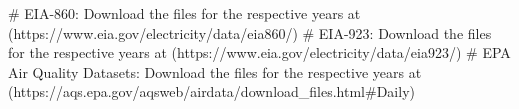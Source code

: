 # EIA-860: Download the files for the respective years at (https://www.eia.gov/electricity/data/eia860/)
# EIA-923: Download the files for the respective years at (https://www.eia.gov/electricity/data/eia923/)
# EPA Air Quality Datasets: Download the files for the respective years at (https://aqs.epa.gov/aqsweb/airdata/download_files.html#Daily)